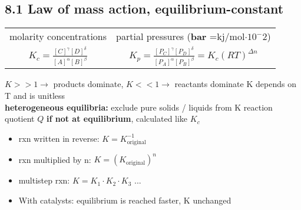 \subsection{8.1 Law of mass action, equilibrium-constant}
    \begin{tabular}{c c}
        molarity concentrations & partial pressures (\textbf{bar} =kj/mol$ \cdot 10^-2$)\\
        $K_c = \frac{[C]^{\gamma} [D]^{\delta}}{[A]^{\alpha} [B]^{\beta}}$ & $K_p = \frac{[P_C]^{\gamma} [P_D]^{\delta}}{[P_A]^{\alpha} [P_B]^{\beta}} = K_c (RT)^{\Delta n}$
    \end{tabular}
    $K >> 1 \rightarrow$ products dominate, $K << 1 \rightarrow$ reactants dominate
    K depends on T and is unitless\\
    \textbf{heterogeneous equilibria:} exclude pure solids / liquids from K
    reaction quotient $Q$ \textbf{if not at equilibrium}, calculated like $K_c$
    \begin{itemize}
        \itemsep0em
        \item rxn written in reverse: $K = K^{-1}_{\textrm{original}}$
        \item rxn multiplied by n: $K = (K_{\textrm{original}})^n$
        \item multistep rxn: $K = K_1 \cdot K_2 \cdot K_3$ ...
        \item With catalysts: equilibrium is reached faster, K unchanged
    \end{itemize}